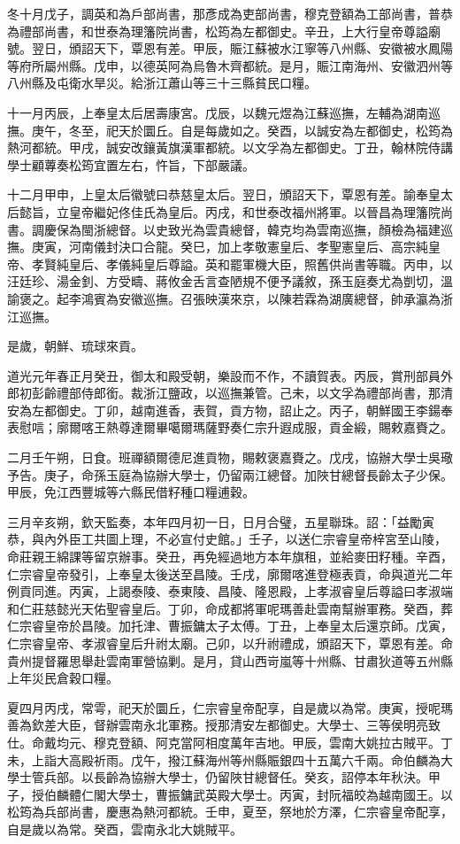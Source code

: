 \begin{pinyinscope}
冬十月戊子，調英和為戶部尚書，那彥成為吏部尚書，穆克登額為工部尚書，普恭為禮部尚書，和世泰為理籓院尚書，松筠為左都御史。辛丑，上大行皇帝尊謚廟號。翌日，頒詔天下，覃恩有差。甲辰，賑江蘇被水江寧等八州縣、安徽被水鳳陽等府所屬州縣。戊申，以德英阿為烏魯木齊都統。是月，賑江南海州、安徽泗州等八州縣及屯衛水旱災。給浙江蕭山等三十三縣貧民口糧。

十一月丙辰，上奉皇太后居壽康宮。戊辰，以魏元煜為江蘇巡撫，左輔為湖南巡撫。庚午，冬至，祀天於圜丘。自是每歲如之。癸酉，以誠安為左都御史，松筠為熱河都統。甲戌，誠安改鑲黃旗漢軍都統。以文孚為左都御史。丁丑，翰林院侍講學士顧蓴奏松筠宜置左右，忤旨，下部嚴議。

十二月甲申，上皇太后徽號曰恭慈皇太后。翌日，頒詔天下，覃恩有差。諭奉皇太后懿旨，立皇帝繼妃佟佳氏為皇后。丙戌，和世泰改福州將軍。以晉昌為理籓院尚書。調慶保為閩浙總督。以史致光為雲貴總督，韓克均為雲南巡撫，顏檢為福建巡撫。庚寅，河南儀封決口合龍。癸巳，加上孝敬憲皇后、孝聖憲皇后、高宗純皇帝、孝賢純皇后、孝儀純皇后尊謚。英和罷軍機大臣，照舊供尚書等職。丙申，以汪廷珍、湯金釗、方受疇、蔣攸金舌言查陋規不便予議敘，孫玉庭奏尤為剴切，溫諭褒之。起李鴻賓為安徽巡撫。召張映漢來京，以陳若霖為湖廣總督，帥承瀛為浙江巡撫。

是歲，朝鮮、琉球來貢。

道光元年春正月癸丑，御太和殿受朝，樂設而不作，不讀賀表。丙辰，賞刑部員外郎初彭齡禮部侍郎銜。裁浙江鹽政，以巡撫兼管。己未，以文孚為禮部尚書，那清安為左都御史。丁卯，越南進香，表賀，貢方物，詔止之。丙子，朝鮮國王李鍚奉表慰唁；廓爾喀王熱尊達爾畢噶爾瑪薩野奏仁宗升遐成服，貢金緞，賜敕嘉賚之。

二月壬午朔，日食。班禪額爾德尼進貢物，賜敕褒嘉賚之。戊戌，協辦大學士吳璥予告。庚子，命孫玉庭為協辦大學士，仍留兩江總督。加陜甘總督長齡太子少保。甲辰，免江西豐城等六縣民借籽種口糧逋穀。

三月辛亥朔，欽天監奏，本年四月初一日，日月合璧，五星聯珠。詔：「益勵寅恭，與內外臣工共圖上理，不必宣付史館。」壬子，以送仁宗睿皇帝梓宮至山陵，命莊親王綿課等留京辦事。癸丑，再免經過地方本年旗租，並給麥田籽種。辛酉，仁宗睿皇帝發引，上奉皇太後送至昌陵。壬戌，廓爾喀進登極表貢，命與道光二年例貢同進。丙寅，上謁泰陵、泰東陵、昌陵、隆恩殿，上孝淑睿皇后尊謚曰孝淑端和仁莊慈懿光天佑聖睿皇后。丁卯，命成都將軍呢瑪善赴雲南幫辦軍務。癸酉，葬仁宗睿皇帝於昌陵。加托津、曹振鏞太子太傅。丁丑，上奉皇太后還京師。戊寅，仁宗睿皇帝、孝淑睿皇后升祔太廟。己卯，以升祔禮成，頒詔天下，覃恩有差。命貴州提督羅思舉赴雲南軍營協剿。是月，貸山西岢嵐等十州縣、甘肅狄道等五州縣上年災民倉穀口糧。

夏四月丙戌，常雩，祀天於圜丘，仁宗睿皇帝配享，自是歲以為常。庚寅，授呢瑪善為欽差大臣，督辦雲南永北軍務。授那清安左都御史。大學士、三等侯明亮致仕。命戴均元、穆克登額、阿克當阿相度萬年吉地。甲辰，雲南大姚拉古賊平。丁未，上詣大高殿祈雨。戊午，撥江蘇海州等州縣賑銀四十五萬六千兩。命伯麟為大學士管兵部。以長齡為協辦大學士，仍留陜甘總督任。癸亥，詔停本年秋決。甲子，授伯麟體仁閣大學士，曹振鏞武英殿大學士。丙寅，封阮福皎為越南國王。以松筠為兵部尚書，慶惠為熱河都統。壬申，夏至，祭地於方澤，仁宗睿皇帝配享，自是歲以為常。癸酉，雲南永北大姚賊平。


\end{pinyinscope}
